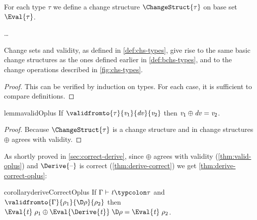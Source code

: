 \begin{definition}
  \label{def:chs-types}
  For each type \ensuremath{\tau} we define a change structure \ensuremath{\ChangeStruct{\tau}} on
  base set \ensuremath{\Eval{\tau}}.
\begin{hscode}\SaveRestoreHook
{}%
%
%
\>[3]{}\ChangeStruct{\iota}\mathrel{=}\ldots{}\<[E]%
\\
\>[3]{}\ChangeStruct{\sigma\to \tau}\mathrel{=}\ChangeStruct{\sigma}\to \ChangeStruct{\tau}{}\<[E]%
\ColumnHook
\end{hscode}\resethooks
\end{definition}
\begin{lemma}
  Change sets and validity, as defined in \cref{def:chs-types},
  give rise to the same basic change structures as the ones
  defined earlier in \cref{def:bchs-types}, and to the change operations
  described in \cref{fig:chs-types}.
\end{lemma}
\begin{proof}
  This can be verified by induction on types. For each case, it
  is sufficient to compare definitions.
\end{proof}
\begin{fullCompile}
\validOplus
\end{fullCompile}
\begin{partCompile}
  \begin{restatable}{lemma}{validOplus}
    \label{thm:valid-oplus}
    If \ensuremath{\validfromto{\tau}{\Varid{v}_{1}}{\Varid{dv}}{\Varid{v}_{2}}} then \ensuremath{\Varid{v}_{1}\oplus \Varid{dv}\mathrel{=}\Varid{v}_{2}}.
  \end{restatable}
\end{partCompile}
\begin{proof}
  Because \ensuremath{\ChangeStruct{\tau}} is a change structure and in change structures \ensuremath{\oplus }
  agrees with validity.
\end{proof}

As shortly proved in \cref{sec:correct-derive}, since \ensuremath{\oplus }
agrees with validity (\cref{thm:valid-oplus}) and \ensuremath{\Derive{\text{\textendash}}}
is correct (\cref{thm:derive-correct}) we get
\cref{thm:derive-correct-oplus}:

\begin{fullCompile}
\deriveCorrectOplus
\end{fullCompile}
\begin{partCompile}
\begin{restatable}{corollary}{deriveCorrectOplus}
  \label{thm:derive-correct-oplus}
  If \ensuremath{\Gamma\vdash\Varid{t}\typcolon\tau} and \ensuremath{\validfromto{\Gamma}{\rho_{1}}{\D\rho}{\rho_{2}}} then
  \ensuremath{\Eval{\Varid{t}}\;\rho_{1}\oplus \Eval{\Derive{\Varid{t}}}\;\D\rho\mathrel{=}\Eval{\Varid{t}}\;\rho_{2}}.
\end{restatable}
\end{partCompile}

